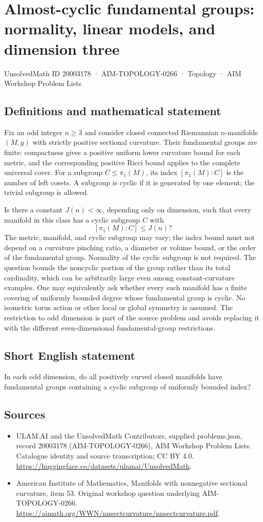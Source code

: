 \documentclass[11pt,a4paper]{article}
\begin{document}
\section*{Almost-cyclic fundamental groups: normality, linear models, and dimension three}\label{20003178}
{\small UnsolvedMath ID 20003178 · AIM-TOPOLOGY-0266 · Topology · AIM Workshop Problem Lists}
\subsection{Definitions and mathematical statement}
Fix an odd integer $n\geq3$ and consider closed connected Riemannian $n$-manifolds $(M,g)$ with strictly positive sectional curvature.
Their fundamental groups are finite: compactness gives a positive uniform lower curvature bound for each metric, and the corresponding positive Ricci bound applies to the complete universal cover.
For a subgroup $C\leq\pi_1(M)$, its index $[\pi_1(M):C]$ is the number of left cosets.
A subgroup is cyclic if it is generated by one element; the trivial subgroup is allowed.

Is there a constant $J(n)<\infty$, depending only on dimension, such that every manifold in this class has a cyclic subgroup $C$ with
\[
 [\pi_1(M):C]\leq J(n)?
\]
The metric, manifold, and cyclic subgroup may vary; the index bound must not depend on a curvature pinching ratio, a diameter or volume bound, or the order of the fundamental group.
Normality of the cyclic subgroup is not required.
The question bounds the noncyclic portion of the group rather than its total cardinality, which can be arbitrarily large even among constant-curvature examples.
One may equivalently ask whether every such manifold has a finite covering of uniformly bounded degree whose fundamental group is cyclic.
No isometric torus action or other local or global symmetry is assumed.
The restriction to odd dimension is part of the source problem and avoids replacing it with the different even-dimensional fundamental-group restrictions.
\subsection{Short English statement}
In each odd dimension, do all positively curved closed manifolds have fundamental groups containing a cyclic subgroup of uniformly bounded index?
\subsection{Sources}
\begin{itemize}
\item[S1] ULAM.AI and the UnsolvedMath Contributors, supplied problems.json, record 20003178 (AIM-TOPOLOGY-0266), AIM Workshop Problem Lists. Catalogue identity and source transcription; CC BY 4.0.
\url{https://huggingface.co/datasets/ulamai/UnsolvedMath}.
\item[S2] American Institute of Mathematics, Manifolds with nonnegative sectional curvature, item 53. Original workshop question underlying AIM-TOPOLOGY-0266.
\url{https://aimath.org/WWN/nnsectcurvature/nnsectcurvature.pdf}.
\end{itemize}
\end{document}

